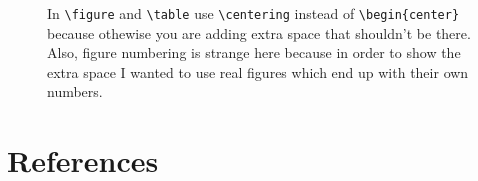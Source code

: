 \documentclass[pharmbio, watermark]{pbpreprint}
\begin{document}
\begin{figure}
\hfill
{}
\caption{In \texttt{\textbackslash figure} and \texttt{\textbackslash table} use \texttt{\textbackslash centering} instead of \texttt{\textbackslash begin\{center\}} because othewise you are adding extra space that shouldn't be there. Also, figure numbering is strange here because in order to show the extra space I wanted to use real figures which end up with their own numbers.}
\end{figure}

\section{References}
\printbibliography[heading=none]
\end{document}
